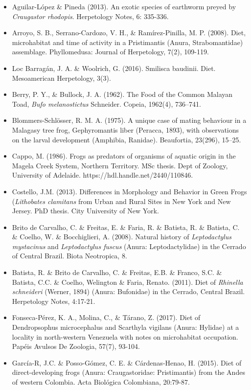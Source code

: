 \begin{itemize}
\item Aguilar-López \& Pineda (2013). An exotic species of earthworm preyed by \textit{Craugastor rhodopis}. Herpetology Notes, 6: 335-336.
\item Arroyo, S. B., Serrano-Cardozo, V. H., \& Ramírez-Pinilla, M. P. (2008). Diet, microhabitat and time of activity in a Pristimantis (Anura, Strabomantidae) assemblage. Phyllomedusa: Journal of Herpetology, 7(2), 109-119.         
\item Loc Barragán, J. A. \& Woolrich, G. (2016). Smilisca baudinii. Diet. Mesoamerican Herpetology, 3(3).
\item Berry, P. Y., \& Bullock, J. A. (1962). The Food of the Common Malayan Toad, \textit{Bufo melanostictus} Schneider. Copeia, 1962(4), 736–741. 
\item Blommers-Schlösser, R. M. A. (1975). A unique case of mating behaviour in a Malagasy tree frog, Gephyromantis liber (Peracca, 1893), with observations on the larval development (Amphibia, Ranidae). Beaufortia, 23(296), 15–25.
\item Cappo, M. (1986). Frogs as predators of organisms of aquatic origin in the Magela Creek System, Northern Territory. MSc thesis. Dept of Zoology, University of Adelaide. https://hdl.handle.net/2440/110846.
\item Costello, J.M. (2013). Differences in Morphology and Behavior in Green Frogs (\textit{Lithobates clamitans} from Urban and Rural Sites in New York and New Jersey. PhD thesis. City University of New York. 
\item Brito de Carvalho, C. \& Freitas, E. \& Faria, R. \& Batista, R. \& Batista, C. \& Coelho, W. \& Bocchiglieri, A. (2008). Natural history of \textit{Leptodactylus mystacinus} and \textit{Leptodactylus fuscus} (Anura: Leptodactylidae) in the Cerrado of Central Brazil. Biota Neotropica, 8. 
\item Batista, R. \& Brito de Carvalho, C. \& Freitas, E.B. \& Franco, S.C. \& Batista, C.C. \& Coelho, Welington \& Faria, Renato. (2011). Diet of \textit{Rhinella schneideri} (Werner, 1894) (Anura: Bufonidae) in the Cerrado, Central Brazil. Herpetology Notes, 4:17-21. 
\item Fonseca-Pérez, K. A., Molina, C., \& Tárano, Z. (2017). Diet of Dendropsophus microcephalus and Scarthyla vigilans (Anura: Hylidae) at a locality in north-western Venezuela with notes on microhabitat occupation. Papéis Avulsos De Zoologia, 57(7), 93-104.
\item García-R, J.C. \& Posso-Gómez, C. E. \& Cárdenas-Henao, H. (2015). Diet of direct-developing frogs (Anura: Craugastoridae: Pristimantis) from the Andes of western Colombia. Acta Biológica Colombiana, 20:79-87. 

\end{itemize}
